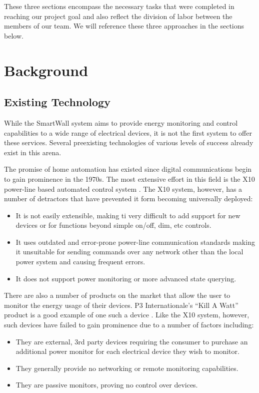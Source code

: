 \documentclass[12pt]{article}
\begin{document}
These three sections encompass the necessary tasks that were completed
in reaching our project goal and also reflect the division of labor
between the members of our team. We will reference these three
approaches in the sections below.

\section{Background}

\subsection{Existing Technology}

While the SmartWall system aims to provide energy monitoring and
control capabilities to a wide range of electrical devices, it is not the
first system to offer these services. Several preexisting technologies
of various levels of success already exist in this arena.

The promise of home automation has existed since digital communications
begin to gain prominence in the 1970s. The most extensive effort in this
field is the X10 power-line based automated control system
\cite{wiki-X10}. The X10 system, however, has a number of detractors
that have prevented it form becoming universally deployed:
\begin{itemize}
  \setlength{\itemsep}{0pt}
  \setlength{\parskip}{0pt}
  \setlength{\parsep}{0pt}
\item It is not easily extensible, making ti very difficult to add
  support for new devices or for functions beyond simple on/off, dim,
  etc controls.
\item It uses outdated and error-prone power-line communication
  standards making it unsuitable for sending commands over any network
  other than the local power system and causing frequent errors.
\item It does not support power monitoring or more advanced state querying.
\end{itemize}  

There are also a number of products on the market that allow the user
to monitor the energy usage of their devices. P3 Internationale's
``Kill A Watt'' product is a good example of one such a device
\cite{p3-KillAWatt}. Like the X10 system, however, such devices have
failed to gain prominence due to a number of factors including:
\begin{itemize}
  \setlength{\itemsep}{0pt}
  \setlength{\parskip}{0pt}
  \setlength{\parsep}{0pt}
\item They are external, 3rd party devices requiring the consumer to
  purchase an additional power monitor for each electrical device they
  wish to monitor. 
\item They generally provide no networking or remote monitoring capabilities.
\item They are passive monitors, proving no control over devices.
\end{itemize}  
\end{document}
